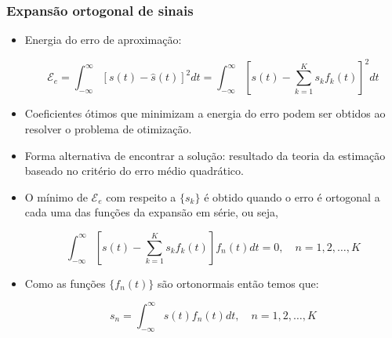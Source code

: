 \begin{frame}
	\frametitle{Expansão ortogonal de sinais}

	\begin{itemize}
		\item Energia do erro de aproximação:
		\begin{small}\begin{equation*}
			\mathcal{E}_e = \int_{-\infty}^{\infty}[s(t)-\hat{s}(t)]^2 dt = \int_{-\infty}^{\infty}\left[ s(t) - \sum_{k=1}^{K} s_k f_k(t) \right]^2 dt
		\end{equation*}		               \end{small}
		\item Coeficientes ótimos que minimizam a energia do erro podem ser obtidos ao resolver o problema de otimização.
		\item Forma alternativa de encontrar a solução: resultado da teoria da estimação baseado no critério do erro médio quadrático.
		\item O mínimo de $\mathcal{E}_e$ com respeito a $\{s_k\}$ é obtido quando o erro é ortogonal a cada uma das funções da expansão em série, ou seja,
		\begin{small}\begin{equation*}
			\int_{-\infty}^{\infty}\left[ s(t) - \sum_{k=1}^{K} s_k f_k(t) \right]f_n(t) dt = 0,  \quad n=1, 2, \ldots, K
		\end{equation*}		               \end{small}
		\item Como as funções $\{f_n(t)\}$ são ortonormais então temos que:
		\begin{small}\begin{equation*}
			s_n = \int_{-\infty}^{\infty} s(t) f_n(t) dt,  \quad n=1, 2, \ldots, K
		\end{equation*}		               \end{small}
	\end{itemize}
\end{frame}

